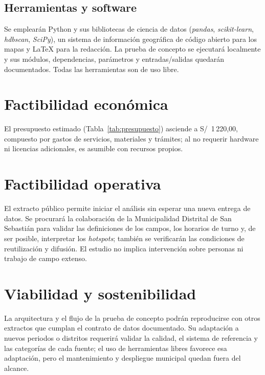 \subsection{Herramientas y software}

Se emplearán Python y sus bibliotecas de ciencia de datos (\textit{pandas}, \textit{scikit-learn}, \textit{hdbscan}, \textit{SciPy}), un sistema de información geográfica de código abierto para los mapas y \LaTeX{} para la redacción. La prueba de concepto se ejecutará localmente y sus módulos, dependencias, parámetros y entradas/salidas quedarán documentados. Todas las herramientas son de uso libre.

\section{Factibilidad económica}

El presupuesto estimado (Tabla~\ref{tab:presupuesto}) asciende a S/~1\,220,00, compuesto por gastos de servicios, materiales y trámites; al no requerir hardware ni licencias adicionales, es asumible con recursos propios.

\section{Factibilidad operativa}

El extracto público permite iniciar el análisis sin esperar una nueva entrega de datos. Se procurará la colaboración de la Municipalidad Distrital de San Sebastián para validar las definiciones de los campos, los horarios de turno y, de ser posible, interpretar los \textit{hotspots}; también se verificarán las condiciones de reutilización y difusión. El estudio no implica intervención sobre personas ni trabajo de campo extenso.

\section{Viabilidad y sostenibilidad}

La arquitectura y el flujo de la prueba de concepto podrán reproducirse con otros extractos que cumplan el contrato de datos documentado. Su adaptación a nuevos periodos o distritos requerirá validar la calidad, el sistema de referencia y las categorías de cada fuente; el uso de herramientas libres favorece esa adaptación, pero el mantenimiento y despliegue municipal quedan fuera del alcance.

